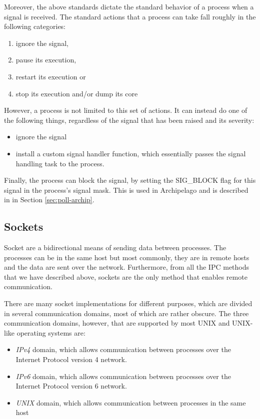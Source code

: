Moreover, the above standards dictate the standard behavior of a process when a 
signal is received. The standard actions that a process can take fall roughly 
in the following categories:

\begin{enumerate}
	\item ignore the signal,
	\item pause its execution,
	\item restart its execution or
	\item stop its execution and/or dump its core
\end{enumerate}

However, a process is not limited to this set of actions. It can instead do one 
of the following things, regardless of the signal that has been raised and its 
severity:

\begin{itemize}
	\item ignore the signal
	\item install a custom signal handler function, which essentially 
		passes the signal handling task to the process.
\end{itemize}

Finally, the process can block the signal, by setting the SIG\_BLOCK flag for 
this signal in the process's signal mask. This is used in Archipelago and is 
described in in Section \ref{sec:poll-archip}.

\subsection{Sockets}

Socket are a bidirectional means of sending data between processes. The 
processes can be in the same host but most commonly, they are in remote hosts 
and the data are sent over the network. Furthermore, from all the IPC methods 
that we have described above, sockets are the only method that enables remote 
communication. 

There are many socket implementations for different purposes, which are divided 
in several communication domains, most of which are rather obscure. The three 
communication domains, however, that are supported by most UNIX and UNIX-like 
operating systems are:

\begin{itemize}
	\item \textit{IPv4} domain, which allows communication between 
		processes over the Internet Protocol version 4 network.
	\item \textit{IPv6} domain, which allows communication between 
		processes over the Internet Protocol version 6 network.
	\item \textit{UNIX} domain, which allows communication between 
		processes in the same host
\end{itemize}


